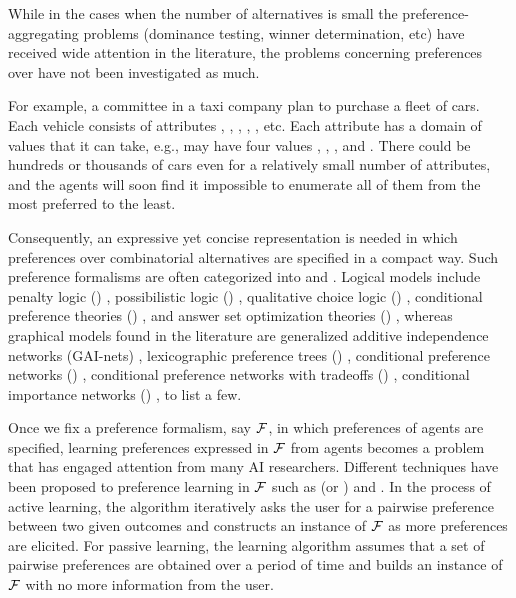 While in the cases when the
number of alternatives is small the preference-aggregating 
problems (dominance testing, winner determination,
etc) have received wide attention in the literature,
the problems concerning preferences over  have not been investigated as much.

For example, a committee in a taxi company plan to purchase a fleet of
cars.
Each vehicle consists of attributes , ,
, , , etc.  
Each attribute has a domain of values that it can take, e.g.,
 may have four values , , , and .
There could be hundreds or thousands of cars even for
a relatively small number of attributes, and
the agents will soon find it impossible to enumerate all of
them from the most preferred to the least.

Consequently, an expressive yet concise representation is needed in which
preferences over combinatorial alternatives are specified
in a compact way.
Such preference formalisms are often categorized into  and
.
Logical models include penalty logic () \cite{haddawy1992representations}, 
possibilistic logic () \cite{DuboisLP91},
qualitative choice logic () \cite{brewka2004qualitative},
conditional preference theories () \cite{Wilson04extendingcp-nets},
and answer set optimization theories () \cite{Brewka:ASO},
whereas graphical models found in the literature are
generalized additive independence networks (GAI-nets) \cite{BacchusG95,LIP61766},
lexicographic preference trees () \cite{booth:learningLP,conf/adt13/LiuT},
conditional preference networks () \cite{Kaci:Pref},
conditional preference networks with tradeoffs () \cite{BrafmanD02:TCP},
conditional importance networks () \cite{Kaci:Pref},
to list a few.

Once we fix a preference formalism, say $\mathcal{F}$, in which preferences of agents
are specified, learning preferences expressed in $\mathcal{F}$ from agents
becomes a problem that has engaged attention from many AI researchers.
Different techniques have been proposed to preference learning
in $\mathcal{F}$
such as  (or ) and 
 \cite{Furnkranz:pref_learning}.
In the process of
active learning, the algorithm iteratively asks the user for a pairwise 
preference between two given outcomes and constructs
an instance of $\mathcal{F}$ as more preferences are elicited.
For passive learning, the learning algorithm assumes that a set of
pairwise preferences are obtained over a period of time and builds an instance
of $\mathcal{F}$ with no more information from the user.

